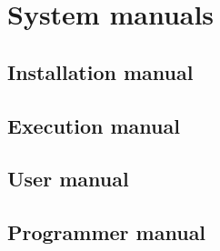 \renewcommand{\documentname}{System manuals}

\chapter{System manuals}


\section{Installation manual}

\section{Execution manual}

\section{User manual}

\section{Programmer manual}


